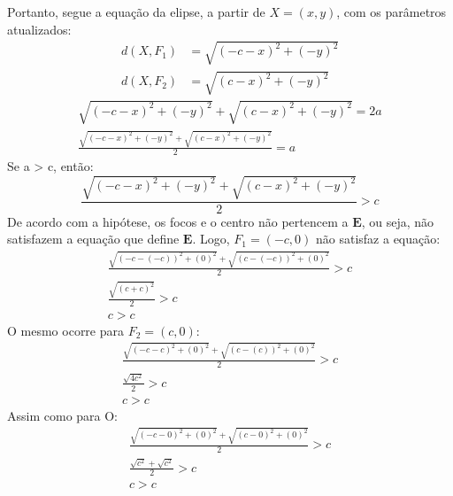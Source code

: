 Portanto, segue a equação da elipse, a partir de $X=(x, y)$, com os parâmetros atualizados:
\newcommand{\distanceDefinitions}{
\begin{aligned}
d(X,F_1) &= \sqrt{(-c - x)^2 + (-y)^2} \\
d(X,F_2) &= \sqrt{(c - x)^2 + (-y)^2}
\end{aligned}
}
\begin{equation}
\distanceDefinitions
\label{eq:distance-definitions}
\end{equation}
\begin{equation}
    \begin{split}
        \sqrt{(-c-x)^2 + (-y)^2} + \sqrt{(c-x)^2 + (-y)^2} = 2a \\
        \frac{ \sqrt{(-c-x)^2 + (-y)^2} + \sqrt{(c-x)^2 + (-y)^2}}{2} = a
    \end{split}
\end{equation}
Se a > c, então:
\begin{equation}
    \frac{ \sqrt{(-c-x)^2 + (-y)^2} + \sqrt{(c-x)^2 + (-y)^2}}{2} > c
\end{equation}
De acordo com a hipótese, os focos e o centro não pertencem a $\mathbf{E}$, ou seja, não satisfazem a equação que define $\mathbf{E}$. Logo, $F_1=(-c,0)$ não satisfaz a equação:
\begin{equation}
    \begin{split}
        \frac{\sqrt{(-c-(-c))^2 + (0)^2} + \sqrt{(c-(-c))^2 + (0)^2}}{2} > c \\
        \frac{\sqrt{(c+c)^2}}{2} > c \\
        c > c
    \end{split}
\end{equation}
O mesmo ocorre para $F_2=(c,0)$:
\begin{equation}
    \begin{split}
        \frac{\sqrt{(-c-c)^2 + (0)^2} + \sqrt{(c-(c))^2 + (0)^2}}{2} > c \\
        \frac{\sqrt{4c^2}}{2} > c \\
        c > c
    \end{split}
\end{equation}
Assim como para O:
\begin{equation}
    \begin{split}
        \frac{\sqrt{(-c-0)^2 + (0)^2} + \sqrt{(c-0)^2 + (0)^2}}{2} > c \\
        \frac{\sqrt{c^2} + \sqrt{c^2}}{2} > c \\
        c > c
    \end{split}
\end{equation}

